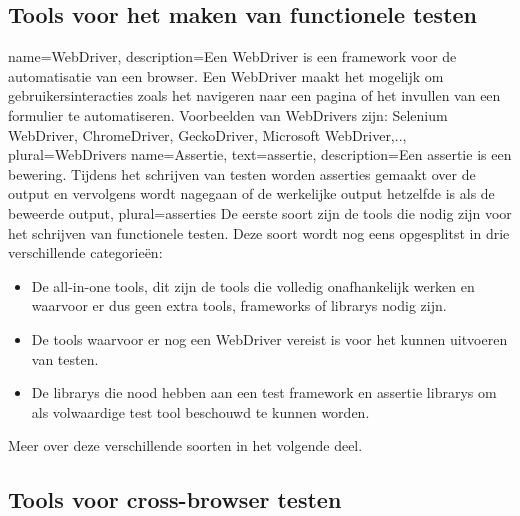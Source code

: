 \subsection{Tools voor het maken van functionele testen}
{
    name=WebDriver,
    description={Een WebDriver is een \gls{framework} voor de automatisatie van een browser. Een WebDriver maakt het mogelijk om gebruikersinteracties zoals het navigeren naar een pagina of het invullen van een formulier te automatiseren. Voorbeelden van WebDrivers zijn: Selenium WebDriver, ChromeDriver, GeckoDriver, Microsoft WebDriver,..},
    plural={WebDrivers}
}
{
    name=Assertie,
    text=assertie,
    description={Een assertie is een bewering. Tijdens het schrijven van testen worden asserties gemaakt over de output en vervolgens wordt nagegaan of de werkelijke output hetzelfde is als de beweerde output},
    plural={asserties}
}
De eerste soort zijn de \glspl{tool} die nodig zijn voor het schrijven van functionele testen. Deze soort wordt nog eens opgesplitst in drie verschillende categorieën: 
\begin{itemize}
\item De all-in-one \glspl{tool}, dit zijn de \glspl{tool} die volledig onafhankelijk werken en waarvoor er dus geen extra \glspl{tool}, \glspl{framework} of \glspl{library} nodig zijn.
\item De \glspl{tool} waarvoor er nog een \gls{WebDriver} vereist is voor het kunnen uitvoeren van testen.
\item De \glspl{library} die nood hebben aan een test \gls{framework} en \gls{assertie} \glspl{library} om als volwaardige test \gls{tool} beschouwd te kunnen worden.
\end{itemize}
Meer over deze verschillende soorten in het volgende deel.


\subsection{Tools voor cross-browser testen}

